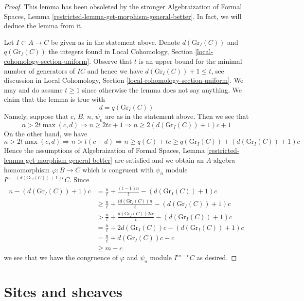 \begin{proof}
This lemma has been obsoleted by the stronger
Algebraization of Formal Spaces, Lemma
\ref{restricted-lemma-get-morphism-general-better}.
In fact, we will deduce the lemma from it.

\medskip\noindent
Let $I \subset A \to C$ be given as in the statement above.
Denote $d(\text{Gr}_I(C))$ and $q(\text{Gr}_I(C))$ the integers found in 
Local Cohomology, Section \ref{local-cohomology-section-uniform}.
Observe that $t$ is an upper bound for the minimal number of generators
of $IC$ and hence we have $d(\text{Gr}_I(C)) + 1 \leq t$, see discussion in
Local Cohomology, Section \ref{local-cohomology-section-uniform}.
We may and do assume $t \geq 1$ since otherwise the lemma does
not say anything. We claim that the lemma is true with
$$
d = q(\text{Gr}_I(C))
$$
Namely, suppose that $c$, $B$, $n$, $\psi_n$ are as in the statement above.
Then we see that
$$
n > 2t\max(c, d) \Rightarrow n \geq 2tc + 1 \Rightarrow
n \geq 2(d(\text{Gr}_I(C)) + 1)c + 1
$$
On the other hand, we have
$$
n > 2t\max(c, d) \Rightarrow n > t(c + d) \Rightarrow
n \geq q(C) + tc \geq q(\text{Gr}_I(C)) + (d(\text{Gr}_I(C)) + 1)c
$$
Hence the assumptions of
Algebraization of Formal Spaces, Lemma
\ref{restricted-lemma-get-morphism-general-better}
are satisfied and we obtain an $A$-algebra homomorphism
$\varphi : B \to C$ which is congruent with $\psi_n$
module $I^{n - (d(\text{Gr}_I(C)) + 1)c}C$.
Since
\begin{align*}
n - (d(\text{Gr}_I(C)) + 1)c
& = \frac{n}{t} + \frac{(t - 1)n}{t} - (d(\text{Gr}_I(C)) + 1)c \\
& \geq \frac{n}{t} + \frac{(d(\text{Gr}_I(C))n}{t} - (d(\text{Gr}_I(C)) + 1)c \\
& > \frac{n}{t} + \frac{d(\text{Gr}_I(C))2tc}{t} - (d(\text{Gr}_I(C)) + 1)c \\
& = \frac{n}{t} + 2d(\text{Gr}_I(C))c - (d(\text{Gr}_I(C)) + 1)c \\
& = \frac{n}{t} + d(\text{Gr}_I(C))c - c \\
& \geq m - c
\end{align*}
we see that we have the congruence of
$\varphi$ and $\psi_n$ module $I^{m - c}C$ as desired.
\end{proof}




\section{Sites and sheaves}
\label{section-sites}

